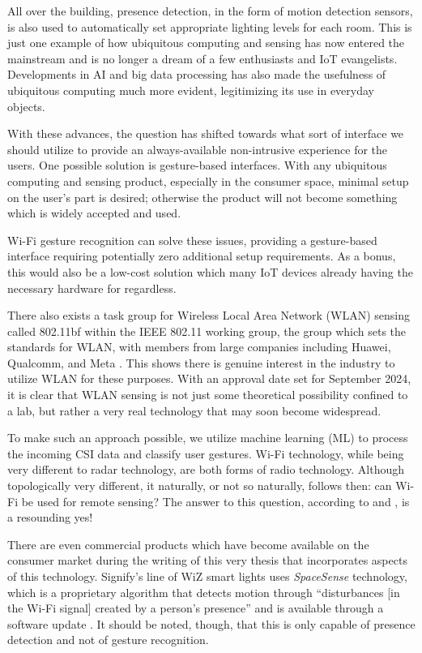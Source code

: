 All over the building, presence detection, in the form of motion detection sensors, is also used to automatically set appropriate lighting levels for each room.
This is just one example of how ubiquitous computing and sensing has now entered the mainstream and is no longer a dream of a few enthusiasts and IoT evangelists.
Developments in AI and big data processing has also made the usefulness of ubiquitous computing much more evident, legitimizing its use in everyday objects.

With these advances, the question has shifted towards what sort of interface we should utilize to provide an always-available non-intrusive experience for the users.
One possible solution is gesture-based interfaces.
With any ubiquitous computing and sensing product, especially in the consumer space, minimal setup on the user's part is desired; otherwise the product will not become something which is widely accepted and used.

Wi-Fi gesture recognition can solve these issues, providing a gesture-based interface requiring potentially zero additional setup requirements.
As a bonus, this would also be a low-cost solution which many IoT devices already having the necessary hardware for regardless.

There also exists a task group for Wireless Local Area Network (WLAN) sensing called 802.11bf within the IEEE 802.11 working group, the group which sets the standards for WLAN, with members from large companies including Huawei, Qualcomm, and Meta \cite{du2022overview}.
This shows there is genuine interest in the industry to utilize WLAN for these purposes.
With an approval date set for September 2024, it is clear that WLAN sensing is not just some theoretical possibility confined to a lab, but rather a very real technology that may soon become widespread.

To make such an approach possible, we utilize machine learning (ML) to process the incoming CSI data and classify user gestures.
Wi-Fi technology, while being very different to radar technology, are both forms of radio technology.
Although topologically very different, it naturally, or not so naturally, follows then: can Wi-Fi be used for remote sensing?
The answer to this question, according to \cite{adib2013see} and \cite{chetty2011through}, is a resounding yes!

There are even commercial products which have become available on the consumer market during the writing of this very thesis that incorporates aspects of this technology. 
Signify's line of WiZ smart lights uses \textit{SpaceSense} technology, which is a proprietary algorithm that detects motion through ``disturbances [in the Wi-Fi signal] created by a person's presence'' and is available through a software update \cite{signify2023spacesense}.
It should be noted, though, that this is only capable of presence detection and not of gesture recognition.

